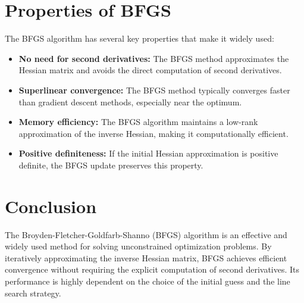 \documentclass[12pt]{article}
\begin{document}
\section{Properties of BFGS}

The BFGS algorithm has several key properties that make it widely used:

\begin{itemize}
   \item \textbf{No need for second derivatives:} The BFGS method approximates the Hessian matrix and avoids the direct computation of second derivatives.
   \item \textbf{Superlinear convergence:} The BFGS method typically converges faster than gradient descent methods, especially near the optimum.
   \item \textbf{Memory efficiency:} The BFGS algorithm maintains a low-rank approximation of the inverse Hessian, making it computationally efficient.
   \item \textbf{Positive definiteness:} If the initial Hessian approximation is positive definite, the BFGS update preserves this property.
\end{itemize}

\section{Conclusion}

The Broyden-Fletcher-Goldfarb-Shanno (BFGS) algorithm is an effective and widely used method for solving unconstrained optimization problems. By iteratively approximating the inverse Hessian matrix, BFGS achieves efficient convergence without requiring the explicit computation of second derivatives. Its performance is highly dependent on the choice of the initial guess and the line search strategy.
\end{document}
